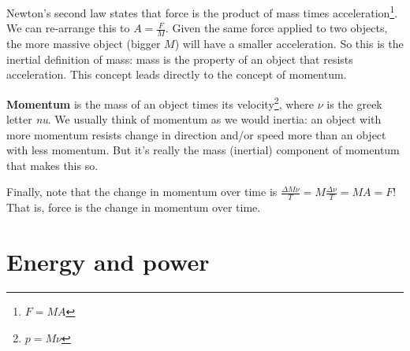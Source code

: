 \documentclass[]{book}
\let\rmarkdownfootnote\footnote%
\def\footnote{\protect\rmarkdownfootnote}
\begin{document}
Newton's second law states that force is the product of mass times
acceleration\footnote{\(F=MA\)}. We can re-arrange this to
\(A=\frac{F}{M}\). Given the same force applied to two objects, the more
massive object (bigger \(M\)) will have a smaller acceleration. So this
is the inertial definition of mass: mass is the property of an object
that resists acceleration. This concept leads directly to the concept of
momentum.

\textbf{Momentum} is the mass of an object times its velocity\footnote{\(p = M\nu\)},
where \(\nu\) is the greek letter \emph{nu}. We usually think of
momentum as we would inertia: an object with more momentum resists
change in direction and/or speed more than an object with less momentum.
But it's really the mass (inertial) component of momentum that makes
this so.

Finally, note that the change in momentum over time is
\(\frac{\Delta M \nu}{T} = M \frac{\Delta \nu}{T} = MA = F\)! That is,
force is the change in momentum over time.

\section{Energy and power}\label{energy-and-power}
\end{document}

